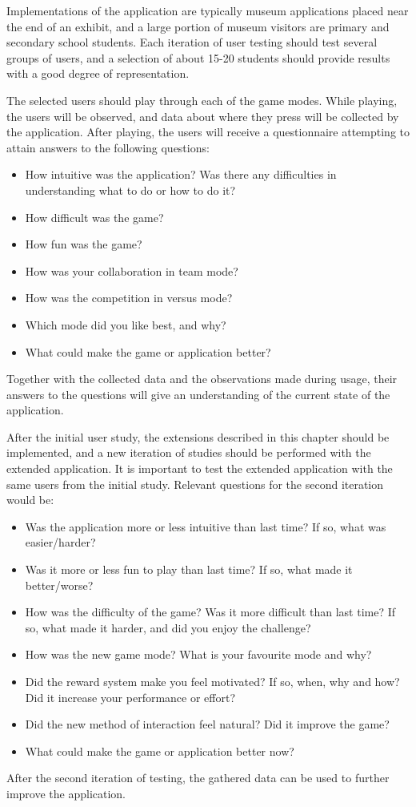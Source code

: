 Implementations of the application are typically museum applications placed near the end of an exhibit, and a large portion of museum visitors are primary and secondary school students. Each iteration of user testing should test several groups of users, and a selection of about 15-20 students should provide results with a good degree of representation.

The selected users should play through each of the game modes. While playing, the users will be observed, and data about where they press will be collected by the application. After playing, the users will receive a questionnaire attempting to attain answers to the following questions:

\begin{itemize}
	\item How intuitive was the application? Was there any difficulties in understanding what to do or how to do it?
	\item How difficult was the game?
	\item How fun was the game?
	\item How was your collaboration in team mode?
	\item How was the competition in versus mode?
	\item Which mode did you like best, and why?
	\item What could make the game or application better?
\end{itemize}

Together with the collected data and the observations made during usage, their answers to the questions will give an understanding of the current state of the application.

After the initial user study, the extensions described in this chapter should be implemented, and a new iteration of studies should be performed with the extended application. It is important to test the extended application with the same users from the initial study. Relevant questions for the second iteration would be:

\begin{itemize}
	\item Was the application more or less intuitive than last time? If so, what was easier/harder?
	\item Was it more or less fun to play than last time? If so, what made it better/worse?
	\item How was the difficulty of the game? Was it more difficult than last time? If so, what made it harder, and did you enjoy the challenge?
	\item How was the new game mode? What is your favourite mode and why?
	\item Did the reward system make you feel motivated? If so, when, why and how? Did it increase your performance or effort?
	\item Did the new method of interaction feel natural? Did it improve the game?
	\item What could make the game or application better now?
\end{itemize}

After the second iteration of testing, the gathered data can be used to further improve the application.